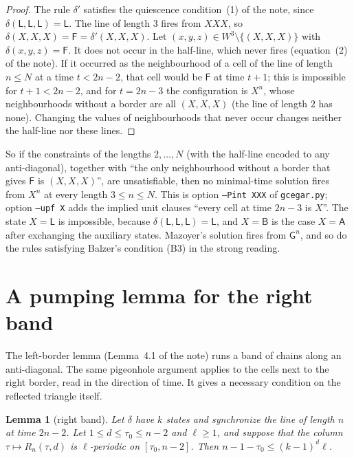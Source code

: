 \documentclass[11pt]{article}
\newtheorem{lemma}[theorem]{Lemma}
\theoremstyle{definition}
\theoremstyle{remark}
\newcommand{\Lq}{\mathsf L}
\newcommand{\Gq}{\mathsf G}
\newcommand{\Aq}{\mathsf A}
\newcommand{\Bq}{\mathsf B}
\newcommand{\Fq}{\mathsf F}
\begin{document}
\begin{proof}
The rule $\delta'$ satisfies the quiescence condition~(1) of the note, since
$\delta(\Lq,\Lq,\Lq)=\Lq$. The line of length $3$ fires from $XXX$, so
$\delta(X,X,X)=\Fq=\delta'(X,X,X)$. Let $(x,y,z)\in W^3\setminus\{(X,X,X)\}$
with $\delta(x,y,z)=\Fq$. It does not occur in the half-line, which never fires
(equation~(2) of the note). If it occurred as the neighbourhood of a cell of the
line of length $n\le N$ at a time $t<2n-2$, that cell would be $\Fq$ at time
$t+1$; this is impossible for $t+1<2n-2$, and for $t=2n-3$ the configuration is
$X^n$, whose neighbourhoods without a border are all $(X,X,X)$ (the line of
length $2$ has none). Changing the values of neighbourhoods that never occur
changes neither the half-line nor these lines.
\end{proof}

So if the constraints of the lengths $2,\dots,N$ (with the half-line encoded to
any anti-diagonal), together with ``the only neighbourhood without a border
that gives $\Fq$ is $(X,X,X)$'', are unsatisfiable, then no minimal-time
solution fires from $X^n$ at every length $3\le n\le N$. This is option
\texttt{--Pint XXX} of \texttt{gcegar.py}; option \texttt{--upf X} adds the
implied unit clauses ``every cell at time $2n-3$ is $X$''. The state
$X=\Lq$ is impossible, because $\delta(\Lq,\Lq,\Lq)=\Lq$, and $X=\Bq$ is the
case $X=\Aq$ after exchanging the auxiliary states. Mazoyer's solution fires
from $\Gq^n$, and so do the rules satisfying Balzer's condition (B3) in the
strong reading.

\section{A pumping lemma for the right band}\label{sec:column}

The left-border lemma (Lemma~4.1 of the note) runs a band of chains along an
anti-diagonal. The same pigeonhole argument applies to the cells next to the
right border, read in the direction of time. It gives a necessary condition on
the reflected triangle itself.

\begin{lemma}[right band]\label{lem:column}
Let $\delta$ have $k$ states and synchronize the line of length $n$ at time
$2n-2$. Let $1\le d\le\tau_0\le n-2$ and $\ell\ge1$, and suppose that the
column $\tau\mapsto R_n(\tau,d)$ is $\ell$-periodic on $[\tau_0,n-2]$. Then
$n-1-\tau_0\le(k-1)^d\ell$.
\end{lemma}
\end{document}
